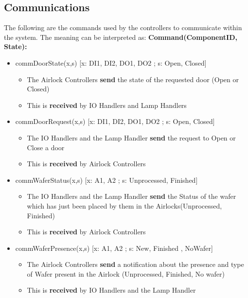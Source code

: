 \documentclass[a4paper,12pt]{article}
\begin{document}
	\subsection {Communications}
	The following are the commands used by the controllers to communicate within the system. The meaning can be interpreted as: 
	\bigskip
	\newline 
	\textbf{Command(ComponentID, State):}
	\begin{itemize}
		\item commDoorState(x,s) [x: DI1, DI2, DO1, DO2 ; s: Open, Closed] 
		\begin{itemize}
			\item The Airlock Controllers \textbf{send} the state of the requested door (Open or Closed)
			\item This is \textbf{received} by IO Handlers and Lamp Handlers
		\end{itemize}
		\bigskip
		
		\item commDoorRequest(x,s) [x: DI1, DI2, DO1, DO2 ; s: Open, Closed]
		\begin{itemize}
			\item The IO Handlers and the Lamp Handler \textbf{send} the request to Open or Close a door 
			\item This is \textbf{received} by Airlock Controllers
		\end{itemize}
		\bigskip
		
		\item commWaferStatus(x,s) [x: A1, A2 ; s: Unprocessed, Finished]
		\begin{itemize}
			\item The IO Handlers and the Lamp Handler \textbf{send} the Status of the wafer which has just been placed by them in the Airlocks(Unprocessed, Finished) 
			\item This is \textbf{received} by Airlock Controllers
		\end{itemize}
		\bigskip
		
		\item commWaferPresence(x,s) [x: A1, A2 ; s: New, Finished , NoWafer]
		\begin{itemize}
			\item The Airlock Controllers \textbf{send} a notification about the presence and type of Wafer present in the Airlock (Unprocessed, Finished, No wafer) 
			\item This is \textbf{received} by IO Handlers and the Lamp Handler
		\end{itemize}
	\end{itemize}
	\newpage
\end{document}
